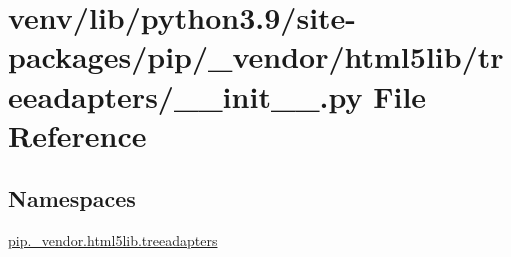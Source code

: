 \hypertarget{venv_2lib_2python3_89_2site-packages_2pip_2__vendor_2html5lib_2treeadapters_2____init_____8py}{}\section{venv/lib/python3.9/site-\/packages/pip/\+\_\+vendor/html5lib/treeadapters/\+\_\+\+\_\+init\+\_\+\+\_\+.py File Reference}
\label{venv_2lib_2python3_89_2site-packages_2pip_2__vendor_2html5lib_2treeadapters_2____init_____8py}
\subsection*{Namespaces}
\begin{DoxyCompactItemize}
\item 
 \hyperlink{namespacepip_1_1__vendor_1_1html5lib_1_1treeadapters}{pip.\+\_\+vendor.\+html5lib.\+treeadapters}
\end{DoxyCompactItemize}
